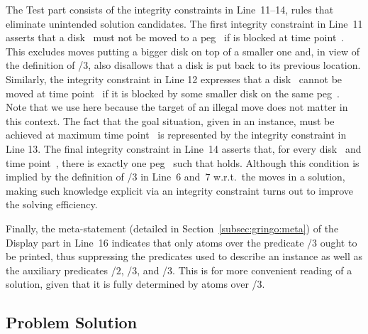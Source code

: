 The Test part consists of the integrity constraints in Line~11--14,
rules that eliminate unintended solution candidates.
The first integrity constraint in Line~11 asserts 
that a disk~ must not be moved to a peg~
if  is blocked at time point~.
This excludes moves putting a bigger disk on top of a smaller one and,
in view of the definition of /$3$,
also disallows that a disk is put back to its previous location.
Similarly, the integrity constraint in Line 12 
expresses that a disk~ cannot be moved at time point~
if it is blocked by some smaller disk on the same peg~.
Note that we use  here because the
target of an illegal move does not matter in this context.
The fact that the goal situation, given in an instance,
must be achieved at maximum time point~
is represented by the integrity constraint in Line 13.
The final integrity constraint in Line~14
asserts that, for every disk~ and time point~, 
there is exactly one peg~ such that
 holds.
Although this condition is implied by the definition of /$3$ in Line~6 and~7
w.r.t.\ the moves in a solution,
making such knowledge explicit via an integrity constraint
turns out to improve the solving efficiency.

Finally, the meta-statement  (detailed in Section~\ref{subsec:gringo:meta})
of the Display part in Line~16
indicates that only atoms over the predicate /$3$ ought to be printed,
thus suppressing the predicates used to describe an instance as well as
the auxiliary predicates /$2$, /$3$, and /$3$.
This is for more convenient reading of a solution,
given that it is fully determined by atoms over /$3$.

\subsection{Problem Solution}


